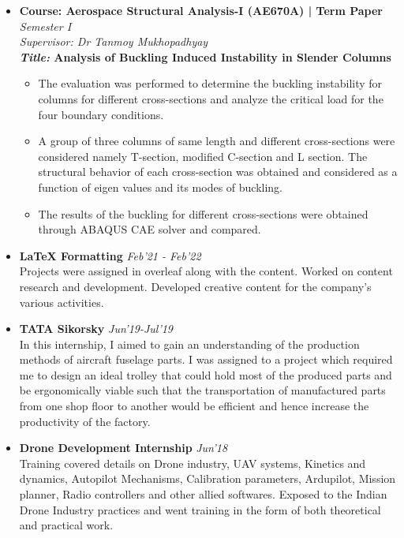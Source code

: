 \documentclass[10pt,article]{article}
\newcommand{\resheading}[1]{{\noindent \large \colorbox{mygrey} { \begin{minipage}{0.99\textwidth}\centering{\textbf{#1 \vphantom{p\^{E}}}}\end{minipage}}}}
\begin{document}
\begin{itemize}
\item \textbf{Course: Aerospace Structural Analysis-I (AE670A) | Term Paper} \hfill \textit{Semester I}\\
\textit{Supervisor: Dr Tanmoy Mukhopadhyay}\\
\textbf{\textit{Title:} Analysis of Buckling Induced Instability in Slender Columns}
\vspace{-2mm}
\begin{itemize}
    \item The evaluation was performed to determine the buckling instability for columns for different cross-sections and analyze the critical load for the four boundary conditions.
    \item A group of three columns of same length and different cross-sections were considered namely T-section, modified C-section and L section. The structural behavior of each cross-section was obtained and considered as a function of eigen values and its modes of buckling. 
    \item The results of the buckling for different cross-sections were obtained through ABAQUS CAE solver and compared.
\end{itemize}
\end{itemize}

\resheading{INTERNSHIP}
\begin{itemize}
\setlength\itemsep{-0.2em}
    \item \textbf{LaTeX Formatting} \hfill \textit{Feb'21 - Feb'22}\\
    Projects were assigned in overleaf along with the content. Worked on content research and development. Developed creative content for the company's various activities.
    \item \textbf{TATA Sikorsky} \hfill \textit{Jun'19-Jul'19}\\
    In this internship, I aimed to gain an understanding of the production methods of aircraft fuselage parts. I was assigned to a project which required me to design an ideal trolley that could hold most of the produced parts and be ergonomically viable such that the transportation of manufactured parts from one shop floor to another would be efficient and hence increase the productivity of the factory. 
    \item \textbf{Drone Development Internship} \hfill \textit{Jun'18}\\
    Training covered details on Drone industry, UAV systems, Kinetics and dynamics, Autopilot Mechanisms, Calibration parameters, Ardupilot, Mission planner, Radio controllers and other allied softwares. Exposed to the Indian Drone Industry practices and went training in the form of both theoretical and practical work.
\end{itemize}
\end{document}
